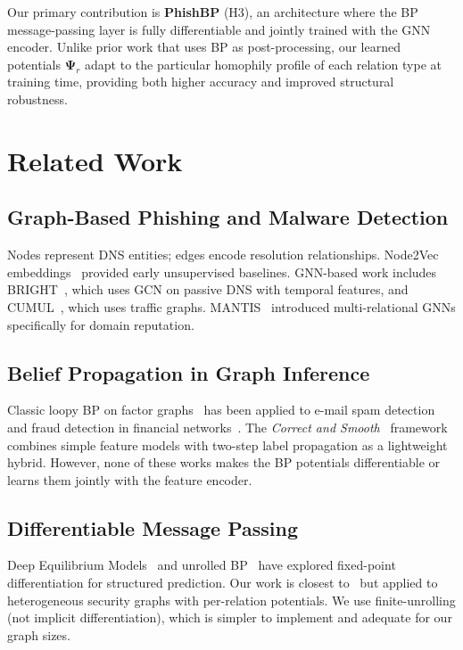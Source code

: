 \documentclass[conference]{IEEEtran}
\begin{document}
Our primary contribution is \textbf{PhishBP} (H3), an architecture where the
BP message-passing layer is fully differentiable and jointly trained with the
GNN encoder. Unlike prior work that uses BP as post-processing, our learned
potentials $\boldsymbol{\Psi}_r$ adapt to the particular homophily profile of
each relation type at training time, providing both higher accuracy and improved
structural robustness.

\section{Related Work}
\label{sec:related}

\subsection{Graph-Based Phishing and Malware Detection}
Nodes represent DNS entities; edges encode resolution relationships. Node2Vec
embeddings~\cite{grover2016} provided early unsupervised baselines.
GNN-based work includes BRIGHT~\cite{shi2022bright}, which uses GCN on
passive DNS with temporal features, and CUMUL~\cite{cumul2015}, which uses
traffic graphs. MANTIS~\cite{mantis2022} introduced multi-relational GNNs
specifically for domain reputation.

\subsection{Belief Propagation in Graph Inference}
Classic loopy BP on factor graphs~\cite{yedidia2003} has been applied to
e-mail spam detection~\cite{spam_bp2007} and fraud detection in financial
networks~\cite{fraud2015}. The \emph{Correct and Smooth}~\cite{huang2021}
framework combines simple feature models with two-step label propagation as a
lightweight hybrid. However, none of these works makes the BP potentials
differentiable or learns them jointly with the feature encoder.

\subsection{Differentiable Message Passing}
Deep Equilibrium Models~\cite{deq2019} and unrolled BP~\cite{satorras2021}
have explored fixed-point differentiation for structured prediction. Our work
is closest to~\cite{satorras2021} but applied to heterogeneous security graphs
with per-relation potentials. We use finite-unrolling (not implicit
differentiation), which is simpler to implement and adequate for our graph sizes.
\end{document}
